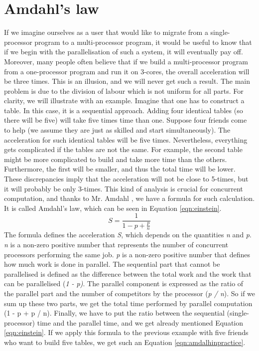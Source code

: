\section{Amdahl's law}
\label{04:amdalhlaw}

If we imagine ourselves as a user that would like to migrate from a single-processor program to a multi-processor program, it would be useful to know that if we begin with the parallelisation of such a system, it will eventually pay off.
Moreover, many people often believe that if we build a multi-processor program from a one-processor program and run it on 3-cores, the overall acceleration will be three times.
This is an illusion, and we will never get such a result.
The main problem is due to the division of labour which is not uniform for all parts.
For clarity, we will illustrate with an example.
Imagine that one has to construct a table.
In this case, it is a sequential approach.
Adding four identical tables (so there will be five) will take five times time than one.
Suppose four friends come to help (we assume they are just as skilled and start simultaneously).
The acceleration for such identical tables will be five times.
Nevertheless, everything gets complicated if the tables are not the same.
For example, the second table might be more complicated to build and take more time than the others.
Furthermore, the first will be smaller, and thus the total time will be lower.
These discrepancies imply that the acceleration will not be close to 5-times, but it will probably be only 3-times.
This kind of analysis is crucial for concurrent computation, and thanks to Mr. Amdahl \cite{amdalh}, we have a formula for such calculation.
It is called Amdahl's law, which can be seen in Equation \eqref{eqn:einstein}.
\begin{equation}
    \label{eqn:einstein}
    S = \frac{1}{1 - p + \frac{p}{n}}
    \tag{1}
\end{equation}
The formula defines the acceleration \emph{S}, which depends on the quantities \emph{n} and \emph{p}. \emph{n} is a non-zero positive number that represents the number of concurrent processors performing the same job. \emph{p} is a non-zero positive number that defines how much work is done in parallel.
The sequential part that cannot be parallelised is defined as the difference between the total work and the work that can be parallelised (\emph{1 - p)}. The parallel component is expressed as the ratio of the parallel part and the number of competitors by the processor (\emph{p / n}).
So if we sum up these two parts, we get the total time performed by parallel computation ({1 - p + p / n}). Finally, we have to put the ratio between the sequential (single-processor) time and the parallel time, and we get already mentioned Equation \ref{eqn:einstein}.
If we apply this formula to the previous example with five friends who want to build five tables, we get such an Equation \eqref{eqn:amdalhinpractice}.

